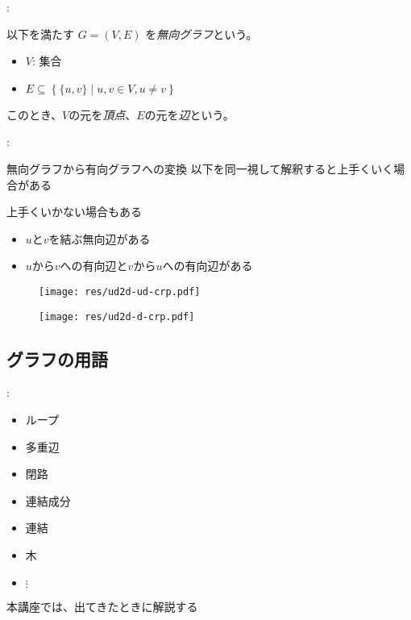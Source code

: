 \documentclass[dvipdfmx]{beamer}
\begin{document}
\begin{frame}{\insertsection: \insertsubsection}
  \begin{definition}
    以下を満たす $G = (V, E)$ を\emph{無向グラフ}という。
    \begin{itemize}
      \item $V$: 集合
      \item $E \subseteq \left\{ \{u, v\} \mid u, v \in V, u \neq v \right\}$
    \end{itemize}
    このとき、$V$の元を\emph{頂点}、$E$の元を\emph{辺}という。
  \end{definition}
\end{frame}

\begin{frame}{\insertsection: \insertsubsection}
  \begin{block}{無向グラフから有向グラフへの変換}
    以下を同一視して解釈すると上手くいく場合がある

    上手くいかない場合もある
    \begin{itemize}
      \item $u$と$v$を結ぶ無向辺がある
      \item $u$から$v$への有向辺と$v$から$u$への有向辺がある
    \end{itemize}
    \begin{figure}
      \centering
      \texttt{[image: res/ud2d-ud-crp.pdf]}
    \end{figure}
    \begin{figure}
      \centering
      \texttt{[image: res/ud2d-d-crp.pdf]}
    \end{figure}
  \end{block}
\end{frame}

\subsection{グラフの用語}

\begin{frame}{\insertsection: \insertsubsection}
  \begin{block}{\insertsubsection}
    \begin{itemize}
      \item ループ
      \item 多重辺
      \item 閉路
      \item 連結成分
      \item 連結
      \item 木
      \item $\vdots$
    \end{itemize}
    本講座では、出てきたときに解説する
  \end{block}
\end{frame}
\end{document}
